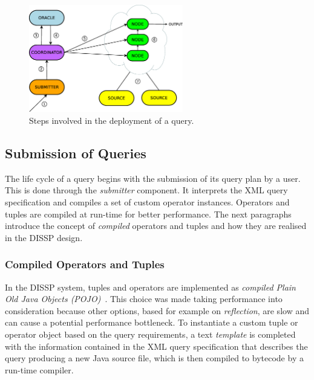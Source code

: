 \begin{figure}[t!]
	\centering
	\includegraphics[width=0.6\textwidth]{img/tesi/query_deployment.eps} 
	\caption{Steps involved in the deployment of a query.}
	\label{fig:qdep}
\end{figure} 
\subsection{Submission of Queries}
\label{sec:qsub}
The life cycle of a query begins with the submission of its query plan by a user. This is done through
the \emph{submitter} component. It interprets the XML query specification and compiles a set of custom
operator instances. Operators and tuples are compiled at run-time for better performance. The next
paragraphs introduce the concept of \emph{compiled} operators and tuples and how they are realised in the
DISSP design.
	
\subsubsection*{Compiled Operators and Tuples}
\label{sec:templates}
In the DISSP system, tuples and operators are implemented as \emph{compiled Plain Old Java
Objects (POJO)}~\cite{pojo}.
This choice was made taking performance into consideration because other options, based for example on
\emph{reflection}, are slow and can cause a potential performance bottleneck. To
instantiate a custom tuple or operator object based on the query requirements, a text \textit{template}
is completed with the information contained in the XML query specification that describes the query
producing a new Java source file, which is then compiled to bytecode by a run-time compiler.
